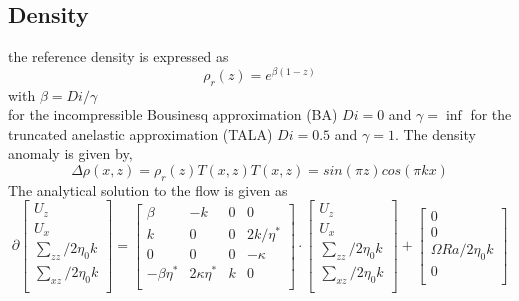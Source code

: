 \subsection{Density}
the reference  density is expressed as 
\begin{equation}
\rho_{r}(z) = e^{\beta(1-z)}
\end{equation} 
with $\beta = Di/\gamma$ \\
for the  incompressible Bousinesq approximation  (BA) $Di = 0$ and $\gamma = \inf$ for the truncated anelastic approximation (TALA) $Di = 0.5$ and $\gamma = 1$.
The density anomaly is given by,
\begin{equation}
\Delta \rho (x,z) = \rho_{r}(z)T(x,z)
T(x,z) = sin(\pi z)cos(\pi k x)
\end{equation}
The analytical solution to the flow is given as
\begin{equation}
\partial \left[ 
\begin{array}{c}
U_{z} \\
U_{x} \\
\sum_{zz}/2\eta_{0}k  \\
\sum_{xz}/2\eta_{0}k  \\            
\end{array}
\right ]
=
\left[ 
\begin{array}{cccc}
 \beta & -k & 0 & 0 \\
k &  0 & 0 & 2 k / \eta^{*} \\
0 & 0 & 0 & -\kappa \\
-\beta \eta^{*} & 2\kappa \eta^{*} & k & 0 \\
\end{array}
\right ]
\cdot
\left[ 
\begin{array}{c}
U_{z} \\
U_{x} \\
\sum_{zz}/2\eta_{0}k  \\
\sum_{xz}/2\eta_{0}k  \\   
\end{array}
  \right ]
+
\left[ 
\begin{array}{c}
0 \\
0 \\
\Omega Ra / 2 \eta_{0} k  \\
0  \\   
\end{array}
  \right ]
\end{equation}
 